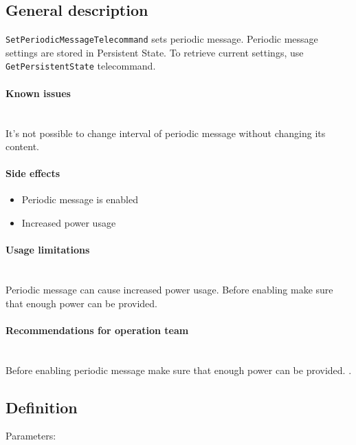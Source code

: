 

\subsection{General description}
\texttt{SetPeriodicMessageTelecommand} sets periodic message. Periodic message settings are stored in Persistent State. To retrieve current settings, use \texttt{GetPersistentState} telecommand. 

\paragraph{Known issues} \mbox{} \\
It's not possible to change interval of periodic message without changing its content.

\paragraph{Side effects}
\begin{itemize}
	\item Periodic message is enabled
	\item Increased power usage
\end{itemize}

\paragraph{Usage limitations} \mbox{} \\
Periodic message can cause increased power usage. Before enabling make sure that enough power can be provided.

\paragraph{Recommendations for operation team} \mbox{} \\
Before enabling periodic message make sure that enough power can be provided. .

\subsection{Definition}

Parameters:

\begin{tcarglist}
\end{tcarglist}

